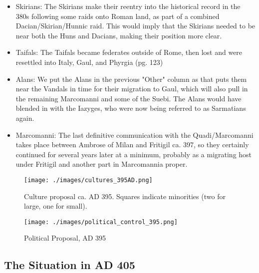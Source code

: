 \documentclass{article}
\begin{document}
\begin{itemize}
		\item Skirians:\newline
		The Skirians make their reentry into the historical record in the 380s following some raids onto Roman land, as part of a combined Dacian/Skirian/Hunnic raid.\newline
		This would imply that the Skirians needed to be near both the Huns and Dacians, making their position more clear.
		
		\item Taifals:\newline
		The Taifals became federates outside of Rome, then lost and were resettled into Italy, Gaul, and Phyrgia \cite{WolframHistoryOfTheGoths} (\tiny pg. 123)\normalsize
		
		\item Alans:\newline
		We put the Alans in the previous "Other" column as that puts them near the Vandals in time for their migration to Gaul, which will also pull in the remaining Marcomanni and some of the Suebi.\newline
		The Alans would have blended in with the Iazyges, who were now being referred to as Sarmatians again.\newline
		
		\item Marcomanni:\newline
		The last definitive communication with the Quadi/Marcomanni takes place between Ambrose of Milan and Fritigil ca. 397, so they certainly continued for several years later at a minimum, probably as a migrating host under Fritigil and another part in Marcomannia proper.
	\end{itemize}
	
	\newpage
	\begin{figure}[h!]
		\centering
		\texttt{[image: ./images/cultures\_395AD.png]}
		\caption{Culture proposal ca. AD 395. Squares indicate minorities (two for large, one for small).}
	\end{figure}
	
	\begin{figure}[h!]
		\centering
		\texttt{[image: ./images/political\_control\_395.png]}
		\caption{Political Proposal, AD 395}
	\end{figure}
	
	\newpage
	\subsection{The Situation in AD 405}
	\label{sec:timeline:subsec:405}
	
\end{document}
